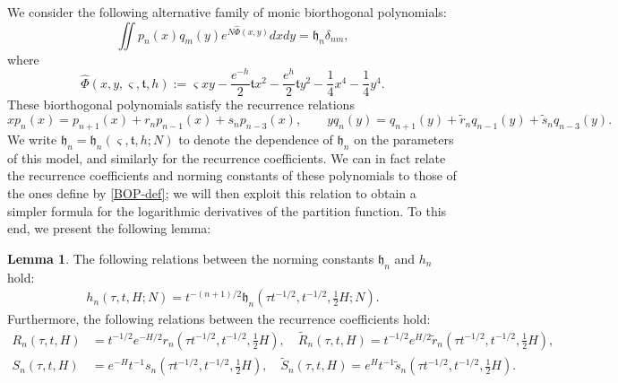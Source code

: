 \documentclass[usenames,dvipsnames]{article}
\theoremstyle{definition}
\newtheorem{lemma}{Lemma}[section]
\numberwithin{equation}{section}
\numberwithin{figure}{section}
\begin{document}
    We consider the following alternative family of monic biorthogonal polynomials:
    \begin{equation}
        \iint p_n(x)q_m(y)e^{N\hat{\Phi}(x,y)}dxdy = \mathfrak{h}_n\delta_{nm},
    \end{equation}
    where
        \begin{equation*}
            \hat{\Phi}(x,y,\varsigma,\mathfrak{t},h) :=\varsigma x y - \frac{e^{-h}}{2}\mathfrak{t}x^2 - \frac{e^{h}}{2}\mathfrak{t}y^2 - \frac{1}{4}x^4-\frac{1}{4}y^4.
        \end{equation*}
    These biorthogonal polynomials satisfy the recurrence relations
        \begin{equation*}
        xp_n(x) = p_{n+1}(x) + r_np_{n-1}(x) + s_np_{n-3}(x),\qquad yq_n(y) = q_{n+1}(y) + \tilde{r}_n q_{n-1}(y) + \tilde{s}_nq_{n-3}(y).
    \end{equation*}
    We write $\mathfrak{h}_n = \mathfrak{h}_n(\varsigma,\mathfrak{t},h;N)$ to denote the dependence
    of $\mathfrak{h}_n$ on the parameters of this model, and similarly for the recurrence coefficients. We can in fact relate the recurrence coefficients and norming constants of these polynomials to those of the ones define by \eqref{BOP-def}; we will then exploit this relation
    to obtain a simpler formula for the logarithmic derivatives of the partition function. To this end, we present the following lemma:
        \begin{lemma}\label{lemmaA1}
            The following relations between the norming constants $\mathfrak{h}_n$ and $h_n$ hold:
                \begin{align}
                    h_n(\tau,t,H;N) = t^{-(n+1)/2}\mathfrak{h}_n\left(\tau t^{-1/2},t^{-1/2},\frac{1}{2}H;N\right).
                \end{align}
            Furthermore, the following relations between the recurrence coefficients hold:
                \begin{align}
                    R_n(\tau,t,H)&= t^{-1/2}e^{-H/2}r_n\left(\tau t^{-1/2},t^{-1/2},\frac{1}{2}H\right),\quad\tilde{R}_n(\tau,t,H) = t^{-1/2}e^{H/2}\tilde{r}_n\left(\tau t^{-1/2},t^{-1/2},\frac{1}{2}H\right),\\
                    S_n(\tau,t,H)&= e^{-H}t^{-1} s_n\left(\tau t^{-1/2},t^{-1/2},\frac{1}{2}H\right),\quad\tilde{S}_n(\tau,t,H)= e^{H} t^{-1}\tilde{s}_n\left(\tau t^{-1/2},t^{-1/2},\frac{1}{2}H\right).
                \end{align}
        \end{lemma}
\end{document}
